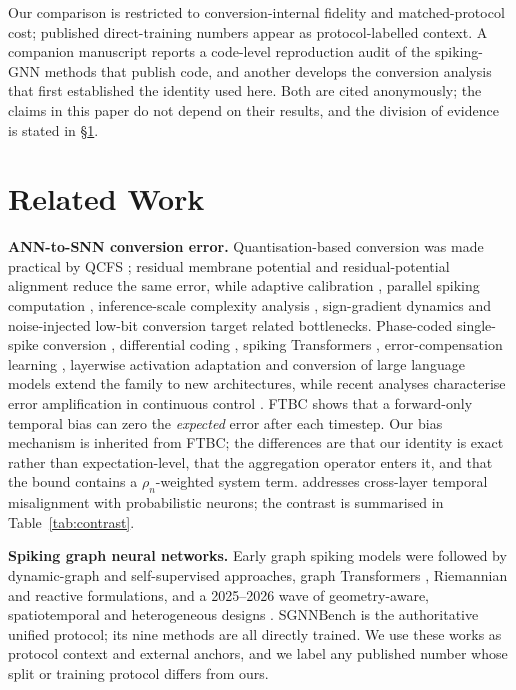 \documentclass[10pt,twocolumn]{article}
\newcommand{\rhon}{\rho_n}
\begin{document}
Our comparison is restricted to conversion-internal fidelity and matched-protocol cost;
published direct-training numbers appear as protocol-labelled context. A companion manuscript \cite{companion} reports a code-level
reproduction audit of the spiking-GNN methods that publish code, and another \cite{companionb}
develops the conversion analysis that first established the identity used here. Both are cited
anonymously; the claims in this paper do not depend on their results, and the division of evidence
is stated in \S\ref{sec:related}.

\section{Related Work}
\label{sec:related}

\textbf{ANN-to-SNN conversion error.} Quantisation-based conversion was made practical by QCFS
\cite{qcfs2022}; residual membrane potential \cite{residual2023} and residual-potential alignment
\cite{rmpalign2026} reduce the same error, while adaptive calibration \cite{adaptcal2024},
parallel spiking computation \cite{parallel2024}, inference-scale complexity analysis
\cite{inference2024}, sign-gradient dynamics \cite{signd2024} and noise-injected low-bit
conversion \cite{noiseadaptor2024} target related bottlenecks. Phase-coded single-spike
conversion \cite{onespike2024}, differential coding \cite{diffcoding2025}, spiking Transformers
\cite{spiketransformer2025,trainfree2025}, error-compensation learning \cite{errorcomp2025},
layerwise activation adaptation \cite{pascal2025} and conversion of large language models
\cite{las2025} extend the family to new architectures, while recent analyses characterise error
amplification in continuous control \cite{erroramp2026}. FTBC \cite{ftbc2024} shows that a
forward-only temporal bias can zero the \emph{expected} error after each timestep. Our bias
mechanism is inherited from FTBC; the differences are that our identity is exact rather than
expectation-level, that the aggregation operator enters it, and that the bound contains a
$\rhon$-weighted system term. \cite{tpp2025} addresses cross-layer temporal misalignment with
probabilistic neurons; the contrast is summarised in Table~\ref{tab:contrast}.

\textbf{Spiking graph neural networks.} Early graph spiking models \cite{gcsnn2021,%
spikinggcn2022} were followed by dynamic-graph \cite{spikenet2023,signn2025} and
self-supervised \cite{spikegcl2024} approaches, graph Transformers \cite{spikegraphormer2024,%
graphormer2021}, Riemannian \cite{msgnn2024} and reactive \cite{drsgnn2024} formulations, and a
2025--2026 wave of geometry-aware, spatiotemporal and heterogeneous designs
\cite{geometry2025,spikestag2025,gtsnt2025,hetero2026,chronospike2026}. SGNNBench
\cite{sgnnbench2025} is the authoritative unified protocol; its nine methods are all directly
trained. We use these works as protocol context and external anchors, and we label any published
number whose split or training protocol differs from ours.
\end{document}
